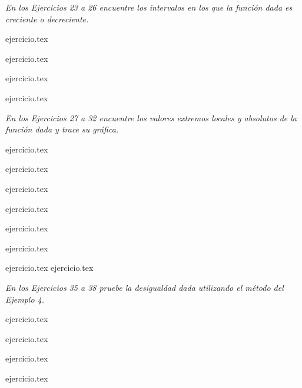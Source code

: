 \vspace{1em}
\noindent \textit{En los Ejercicios 23 a 26 encuentre los intervalos en los que la función dada es creciente o decreciente.}

\begin{enumerate}
    \setcounter{enumi}{22}
    \begin{minipage}{0.45\textwidth}
    {ejercicio.tex}
    \addtocounter{enumi}{1}
    {ejercicio.tex}
    \end{minipage}%
    \begin{minipage}{0.45\textwidth}
    \setcounter{enumi}{23}
    {ejercicio.tex}
    \addtocounter{enumi}{1}
    {ejercicio.tex}
    \end{minipage}
\end{enumerate}

\vspace{1em}
\noindent \textit{En los Ejercicios 27 a 32 encuentre los valores extremos locales y absolutos de la función dada y trace su gráfica.}

\begin{enumerate}
    \setcounter{enumi}{26}
    \begin{minipage}{0.45\textwidth}
    {ejercicio.tex}
    \addtocounter{enumi}{1}
    {ejercicio.tex}
    \addtocounter{enumi}{1}
    {ejercicio.tex}
    \end{minipage}%
    \begin{minipage}{0.45\textwidth}
    \setcounter{enumi}{27}
    {ejercicio.tex}
    \addtocounter{enumi}{1}
    {ejercicio.tex}
    \addtocounter{enumi}{1}
    {ejercicio.tex}
    \end{minipage}
\end{enumerate}

\vspace{1em}
\begin{enumerate}
    \setcounter{enumi}{32}
    {ejercicio.tex}
    {ejercicio.tex}
\end{enumerate}

\vspace{1em}
\noindent \textit{En los Ejercicios 35 a 38 pruebe la desigualdad dada utilizando el método del Ejemplo 4.}

\begin{enumerate}
    \setcounter{enumi}{34}
    \begin{minipage}{0.45\textwidth}
    {ejercicio.tex}
    \addtocounter{enumi}{1}
    {ejercicio.tex}
    \end{minipage}%
    \begin{minipage}{0.45\textwidth}
    \setcounter{enumi}{35}
    {ejercicio.tex}
    \addtocounter{enumi}{1}
    {ejercicio.tex}
    \end{minipage}
\end{enumerate}

